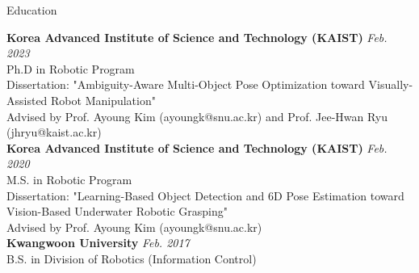 \begin{rSection}{Education}

{\bf Korea Advanced Institute of Science and Technology (KAIST)} \hfill {\em Feb. 2023} \\
Ph.D in Robotic Program \\
Dissertation: "Ambiguity-Aware Multi-Object Pose Optimization toward Visually-Assisted Robot Manipulation" \\
Advised by Prof. Ayoung Kim (ayoungk@snu.ac.kr) and Prof. Jee-Hwan Ryu (jhryu@kaist.ac.kr) \\
    

{\bf Korea Advanced Institute of Science and Technology (KAIST)} \hfill {\em Feb. 2020} \\
M.S. in Robotic Program \\
Dissertation: "Learning-Based Object Detection and 6D Pose Estimation toward Vision-Based Underwater Robotic Grasping" \\
Advised by Prof. Ayoung Kim (ayoungk@snu.ac.kr)\\

{\bf Kwangwoon University} \hfill {\em Feb. 2017} \\
B.S. in Division of Robotics (Information Control) \\



\vspace{-5mm}

\end{rSection}

